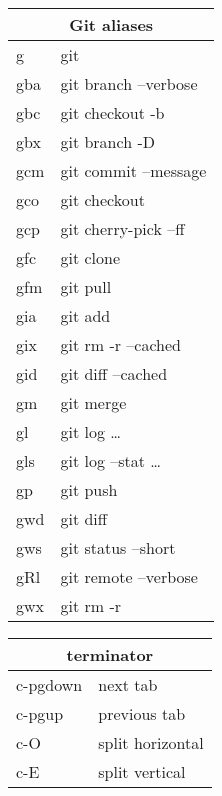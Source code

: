 \documentclass[12pt,paper=landscape,paper=a4]{scrartcl}
\begin{document}
\pagestyle{empty}
\pagecolor{gruvbox_bg} %
\color{gruvbox_fg}

\begin{multicols}{3}

    \begin{tabular}{ll}
        \multicolumn{2}{c}{Git aliases} \\
        \hline
        g    & git\\
        gba  & git branch --verbose\\
        gbc  & git checkout -b\\
        gbx  & git branch -D\\
        gcm  & git commit --message\\
        gco  & git checkout\\
        gcp  & git cherry-pick --ff\\
        gfc  & git clone\\
        gfm  & git pull\\
        gia  & git add\\
        gix  & git rm -r --cached\\
        gid  & git diff --cached\\
        gm   & git merge\\
        gl   & git log \ldots\\
        gls  & git log --stat \ldots\\
        gp   & git push\\
        gwd  & git diff\\
        gws  & git status --short\\
        gRl  & git remote --verbose\\
        gwx  & git rm -r
    \end{tabular}

    \vspace{1em}

    \begin{tabular}{ll}
        \multicolumn{2}{c}{terminator}\\
        \hline
        c-pgdown & next tab\\
        c-pgup  & previous tab\\
        c-O     & split horizontal\\
        c-E     & split vertical
    \end{tabular}


\end{multicols}
\end{document}
